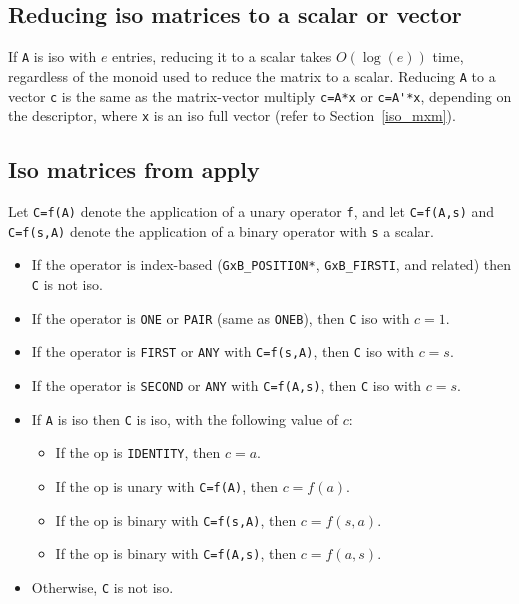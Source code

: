 \documentclass[12pt]{article}
\begin{document}
\subsection{Reducing iso matrices to a scalar or vector}
\label{iso_reduce}

If \verb'A' is iso with $e$ entries, reducing it to a scalar takes $O(\log(e))$
time, regardless of the monoid used to reduce the matrix to a scalar.  Reducing
\verb'A' to a vector \verb'c' is the same as the matrix-vector multiply
\verb"c=A*x" or \verb"c=A'*x", depending on the descriptor, where \verb'x'
is an iso full vector (refer to Section~\ref{iso_mxm}).

\subsection{Iso matrices from apply}
\label{iso_apply}

Let \verb'C=f(A)' denote the application of a unary operator \verb'f',
and let \verb'C=f(A,s)' and \verb'C=f(s,A)' denote the application of a binary
operator with \verb's' a scalar.

    \begin{itemize}
    \item If the operator is index-based (\verb'GxB_POSITION*',
    \verb'GxB_FIRSTI', and related) then \verb'C' is not iso.

    \item If the operator is \verb'ONE' or \verb'PAIR' (same as \verb'ONEB'),
        then \verb'C' iso with $c=1$.

    \item If the operator is \verb'FIRST' or \verb'ANY' with \verb'C=f(s,A)',
        then \verb'C' iso with $c=s$.

    \item If the operator is \verb'SECOND' or \verb'ANY' with \verb'C=f(A,s)',
        then \verb'C' iso with $c=s$.

    \item If \verb'A' is iso then \verb'C' is iso, with the following value
        of $c$:

        \begin{itemize}
        \item If the op is \verb'IDENTITY', then $c=a$.
        \item If the op is unary with \verb'C=f(A)', then $c=f(a)$.
        \item If the op is binary with \verb'C=f(s,A)', then $c=f(s,a)$.
        \item If the op is binary with \verb'C=f(A,s)', then $c=f(a,s)$.
        \end{itemize}


    \item Otherwise, \verb'C' is not iso.
    \end{itemize}
\end{document}
